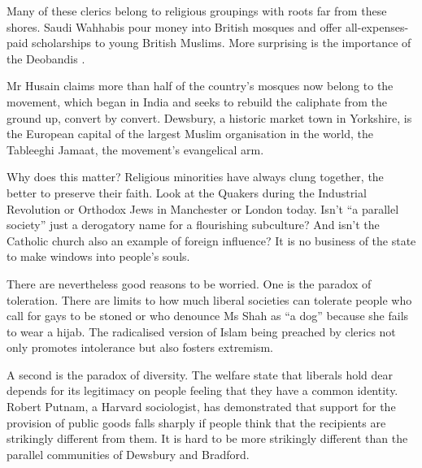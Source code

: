 Many of these clerics belong to religious groupings with roots far from these shores. Saudi Wahhabis pour money into British mosques and offer all-expenses-paid scholarships to young British Muslims. More surprising is the importance of the Deobandis . 

Mr Husain claims more than half of the country’s mosques now belong to the movement, which began in India and seeks to rebuild the caliphate from the ground up, convert by convert. Dewsbury, a historic market town in Yorkshire, is the European capital of the largest Muslim organisation in the world, the Tableeghi Jamaat, the movement’s evangelical arm.

Why does this matter? Religious minorities have always clung together, the better to preserve their faith. Look at the Quakers during the Industrial Revolution or Orthodox Jews in Manchester or London today. Isn’t “a parallel society” just a derogatory name for a flourishing subculture? And isn’t the Catholic church also an example of foreign influence? It is no business of the state to make windows into people’s souls.

There are nevertheless good reasons to be worried. One is the paradox of toleration. There are limits to how much liberal societies can tolerate people who call for gays to be stoned or who denounce Ms Shah as “a dog” because she fails to wear a hijab. The radicalised version of Islam being preached by clerics not only promotes intolerance but also fosters extremism.

A second is the paradox of diversity. The welfare state that liberals hold dear depends for its legitimacy on people feeling that they have a common identity. Robert Putnam, a Harvard sociologist, has demonstrated that support for the provision of public goods falls sharply if people think that the recipients are strikingly different from them. It is hard to be more strikingly different than the parallel communities of Dewsbury and Bradford.
